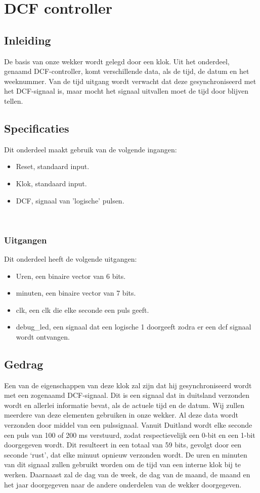 \chapter{DCF controller}
\section{Inleiding}
De basis van onze wekker wordt gelegd door een klok. Uit het onderdeel, genaamd DCF-controller,  komt verschillende data, als de tijd, de datum en het weeknummer. Van de tijd uitgang wordt verwacht dat deze gesynchroniseerd met het DCF-signaal is, maar mocht het signaal uitvallen moet de tijd door blijven tellen.

\section{Specificaties}
Dit onderdeel maakt gebruik van de volgende ingangen:
\newline
\begin{itemize}[nolistsep]
\item Reset, standaard input.
\item Klok, standaard input.
\item DCF, signaal van 'logische' pulsen.
\end{itemize}
\noindent
\\
\subsection{Uitgangen}
Dit onderdeel heeft de volgende uitgangen:
\begin{itemize}[nolistsep]
\item Uren, een binaire vector van 6 bits.
\item minuten, een binaire vector van 7 bits.
\item clk, een clk die elke seconde een puls geeft.
\item debug\_led, een signaal dat een logische 1 doorgeeft zodra er een dcf signaal wordt ontvangen.
\end{itemize}

\section{Gedrag}

Een van de eigenschappen van deze klok zal zijn dat hij gesynchroniseerd wordt met een zogenaamd DCF-signaal. Dit is een signaal dat in duitsland verzonden wordt en allerlei informatie bevat, als de actuele tijd en de datum. Wij zullen meerdere van deze elementen gebruiken in onze wekker.  Al deze data wordt verzonden door middel van een pulssignaal. Vanuit Duitland wordt elke seconde een puls van 100 of 200 ms verstuurd, zodat respectievelijk een 0-bit en een 1-bit doorgegeven wordt. Dit resulteert in een totaal van 59 bits, gevolgt door een seconde ‘rust’, dat elke minuut opnieuw verzonden wordt. De uren en minuten van dit signaal zullen gebruikt worden om de tijd van een interne klok bij te werken. Daarnaast zal de dag van de week, de dag van de maand, de maand en het jaar doorgegeven naar de andere onderdelen van de wekker doorgegeven.
